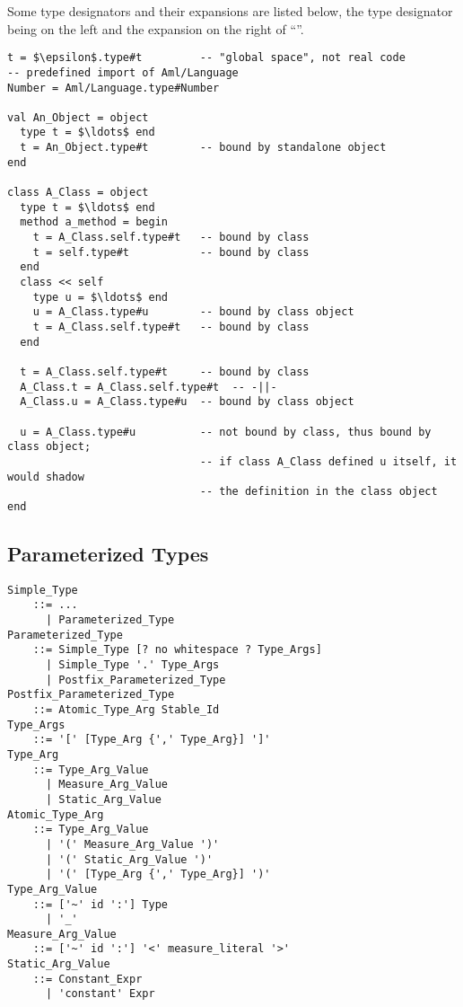 \example Some type designators and their expansions are listed below, the type designator being on the left and the expansion on the right of ``\code{=}''. 
\begin{lstlisting}
t = $\epsilon$.type#t         -- "global space", not real code
-- predefined import of Aml/Language
Number = Aml/Language.type#Number 

val An_Object = object
  type t = $\ldots$ end
  t = An_Object.type#t        -- bound by standalone object
end

class A_Class = object
  type t = $\ldots$ end
  method a_method = begin
    t = A_Class.self.type#t   -- bound by class
    t = self.type#t           -- bound by class
  end
  class << self
    type u = $\ldots$ end
    u = A_Class.type#u        -- bound by class object
    t = A_Class.self.type#t   -- bound by class
  end
  
  t = A_Class.self.type#t     -- bound by class
  A_Class.t = A_Class.self.type#t  -- -||-
  A_Class.u = A_Class.type#u  -- bound by class object
  
  u = A_Class.type#u          -- not bound by class, thus bound by class object;
                              -- if class A_Class defined u itself, it would shadow 
                              -- the definition in the class object
end
\end{lstlisting}




\subsection{Parameterized Types}
\label{sec:parameterized-types}

\grammar\begin{lstlisting}[deletekeywords={no}]
Simple_Type
    ::= ...
      | Parameterized_Type
Parameterized_Type
    ::= Simple_Type [? no whitespace ? Type_Args]
      | Simple_Type '.' Type_Args
      | Postfix_Parameterized_Type
Postfix_Parameterized_Type 
    ::= Atomic_Type_Arg Stable_Id
Type_Args 
    ::= '[' [Type_Arg {',' Type_Arg}] ']'
Type_Arg 
    ::= Type_Arg_Value
      | Measure_Arg_Value
      | Static_Arg_Value
Atomic_Type_Arg
    ::= Type_Arg_Value
      | '(' Measure_Arg_Value ')'
      | '(' Static_Arg_Value ')'
      | '(' [Type_Arg {',' Type_Arg}] ')'
Type_Arg_Value
    ::= ['~' id ':'] Type
      | '_'
Measure_Arg_Value 
    ::= ['~' id ':'] '<' measure_literal '>'
Static_Arg_Value
    ::= Constant_Expr
      | 'constant' Expr
\end{lstlisting}

